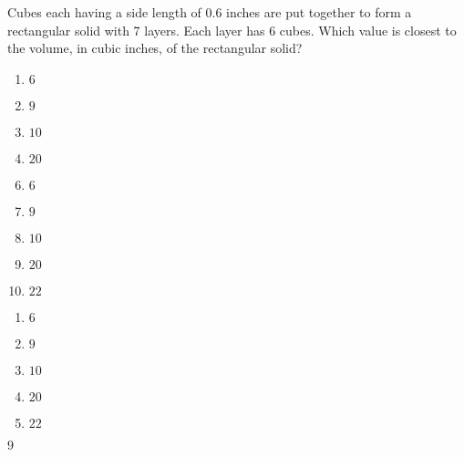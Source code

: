 Cubes each having a side length of 0.6 inches are put together to form a rectangular solid with 7 layers. Each layer has 6 cubes. Which value is closest to the volume, in cubic inches, of the rectangular solid?

\ifsat
	\begin{enumerate}[label=\Alph*)]
		\item   $6$
		\item  $9$ %
		\item  $10$ 
		\item  $20$ 
	\end{enumerate}
\else
\fi

\ifacteven
	\begin{enumerate}[label=\textbf{\Alph*.},itemsep=\fill,align=left]
		\setcounter{enumii}{5}
		\item   $6$
		\item  $9$ %
		\item  $10$ 
		\addtocounter{enumii}{1}
		\item  $20$ 
		\item  $22$  
	\end{enumerate}
\else
\fi

\ifactodd
	\begin{enumerate}[label=\textbf{\Alph*.},itemsep=\fill,align=left]
		\item   $6$
		\item  $9$ %
		\item  $10$ 
		\item  $20$ 
		\item  $22$ 
	\end{enumerate}
\else
\fi

\ifgridin
  $9$ %
		
\else
\fi

